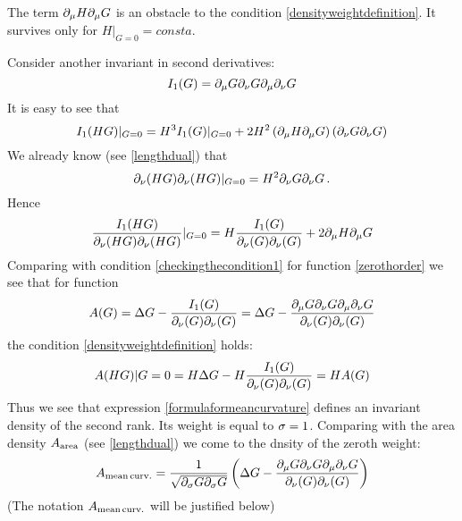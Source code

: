 \documentclass[12pt]{article}
\theoremstyle{theorem}
\begin{document}
The term $\partial_\mu H\partial_\mu G$ is an obstacle to the condition \eqref{densityweightdefinition}.
It survives only for $H\vert_{G=0}=consta$.

Consider another invariant in second derivatives:
                \begin{equation}\label{higherordersecondinvariant}
             I_1(G)=\partial_\mu G\partial_\nu G \partial_\mu\partial_\nu G
                 \end{equation}
It is easy to see that
\begin{equation}\label{checkingthecondition2}
I_1(HG)\vert_{G=0}=H^3I_1(G)\vert_{G=0}+2H^2\left(\partial_\mu H\partial_\mu G\right)
                 \left(\partial_\nu G\partial_\nu G\right)
\end{equation}
We already know (see \eqref{lengthdual}) that
\begin{equation}\label{checkingthecondition3}
\partial_\nu (HG)\partial_\nu (HG)\vert_{G=0}=H^2\partial_\nu G\partial_\nu G\,.
\end{equation}
Hence
\begin{equation}\label{checkingthecondition4}
{I_1(HG)\over \partial_\nu (HG)\partial_\nu (HG)}\vert_{G=0}=
   H{I_1(G)\over \partial_\nu (G)\partial_\nu (G)}+2\partial_\mu H\partial_\mu G
\end{equation}
Comparing with condition \eqref{checkingthecondition1} for function \eqref{zerothorder}
we see that for function
\begin{equation}\label{formulaformeancurvature}
    A(G)=\Delta G-{I_1(G)\over \partial_\nu (G)\partial_\nu (G)}=
    \Delta G-{\partial_\mu G\partial_\nu G \partial_\mu\partial_\nu G\over \partial_\nu (G)\partial_\nu (G)}
\end{equation}
the condition  \eqref{densityweightdefinition}  holds:
\begin{equation}\label{formulaformeancurvature}
    A(HG)\vert{G=0}=H\Delta G-H{I_1(G)\over \partial_\nu (G)\partial_\nu (G)}=
    HA(G)
\end{equation}
Thus we see that expression \eqref{formulaformeancurvature}
defines an invariant density of the second rank. Its weight is equal to ${\sigma}=1$.
Comparing with the area density $A_{\rm area}$ (see \eqref{lengthdual})
we come to the dnsity of the zeroth weight:
\begin{equation}\label{formulaformeancurvature2}
A_{\rm mean\,curv.}={1\over \sqrt {\partial_{\sigma} G\partial_{\sigma} G}}\left(
\Delta G-{\partial_\mu G\partial_\nu G \partial_\mu\partial_\nu G\over \partial_\nu (G)\partial_\nu (G)}
                     \right)
\end{equation}
(The notation $A_{\rm mean\,curv.}$ will be justified below)

\medskip
\end{document}

